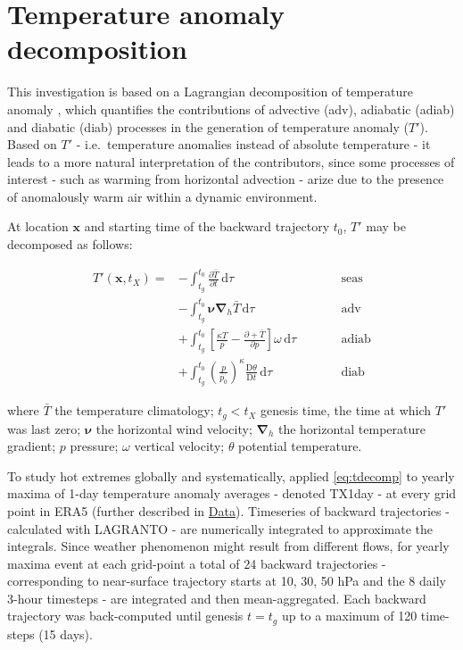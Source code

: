 \documentclass[11pt,a4paper,twoside,openright]{report}
\theoremstyle{definition}
\begin{document}
\section{Temperature anomaly decomposition}\label{temperature-anomaly-decomposition}

This investigation is based on a Lagrangian decomposition of temperature anomaly \citep{rothlisberger_quantifying_2023}, which quantifies the contributions of advective (adv), adiabatic (adiab) and diabatic (diab) processes in the generation of temperature anomaly (\(T'\)). Based on \(T'\) - i.e.~temperature anomalies instead of absolute temperature - it leads to a more natural interpretation of the contributors, since some processes of interest - such as warming from horizontal advection - arize due to the presence of anomalously warm air within a dynamic environment.

At location \(\mathbf{x}\) and starting time of the backward trajectory \(t_0\), \(T'\) may be decomposed as follows:

\begin{equation}
\begin{alignedat}{2}
   T'(\mathbf{x},t_X) = & - \int_{t_g}^{t_0} \frac{\partial \bar{T}}{\partial t} \, \text{d}\tau && \qquad \text{seas} \\
   & - \int_{t_g}^{t_0} \boldsymbol{\nu} \boldsymbol{\nabla}_h \bar{T} \, \text{d}\tau && \qquad \text{adv} \\
   & + \int_{t_g}^{t_0} \left[ \frac{\kappa T}{p} - \frac{\partial +  \bar{T}}{\partial p}\right] \omega \, \text{d}\tau && \qquad \text{adiab} \\
   & + \int_{t_g}^{t_0} \left( \frac{p}{p_0} \right)^\kappa \frac{\text{D}\theta}{\text{D}t} \, \text{d}\tau && \qquad \text{diab}
\end{alignedat}
\label{eq:tdecomp}
\end{equation}

where \(\bar{T}\) the temperature climatology; \(t_g < t_X\) genesis time, the time at which \(T'\) was last zero; \(\boldsymbol{\nu}\) the horizontal wind velocity; \(\boldsymbol{\nabla}_h\) the horizontal temperature gradient; \(p\) pressure; \(\omega\) vertical velocity; \(\theta\) potential temperature.

To study hot extremes globally and systematically, \cite{rothlisberger_quantifying_2023} applied \eqref{eq:tdecomp} to yearly maxima of 1-day temperature anomaly averages - denoted TX1day - at every grid point in ERA5 (further described in \hyperref[data]{Data}). Timeseries of backward trajectories - calculated with LAGRANTO \citep{sprenger_lagranto_2015} - are numerically integrated to approximate the integrals. Since weather phenomenon might result from different flows, for yearly maxima event at each grid-point a total of 24 backward trajectories - corresponding to near-surface trajectory starts at 10, 30, 50 hPa and the 8 daily 3-hour timesteps - are integrated and then mean-aggregated. Each backward trajectory was back-computed until genesis \(t=t_g\) up to a maximum of 120 time-steps (15 days).
\end{document}
